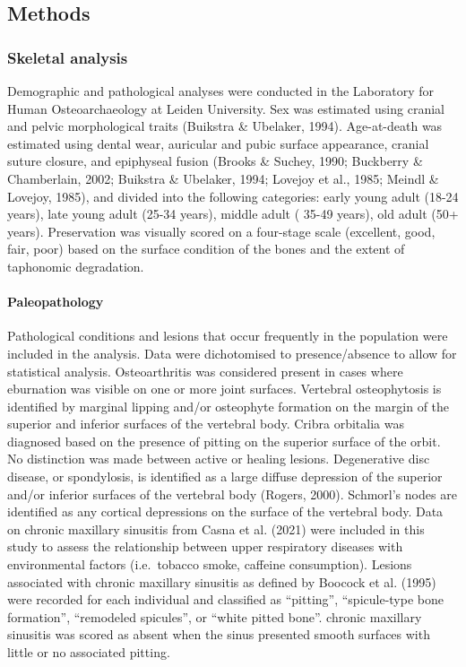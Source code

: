 \documentclass[
]{article}
\let\oldparagraph\paragraph
\renewcommand{\paragraph}[1]{\oldparagraph{#1}\mbox{}}
\begin{document}
\hypertarget{methods}{%
\subsection{Methods}\label{methods}}

\hypertarget{skeletal-analysis}{%
\subsubsection{Skeletal analysis}\label{skeletal-analysis}}

Demographic and pathological analyses were conducted in the Laboratory
for Human Osteoarchaeology at Leiden University. Sex was estimated using
cranial and pelvic morphological traits (Buikstra \& Ubelaker, 1994).
Age-at-death was estimated using dental wear, auricular and pubic
surface appearance, cranial suture closure, and epiphyseal fusion
(Brooks \& Suchey, 1990; Buckberry \& Chamberlain, 2002; Buikstra \&
Ubelaker, 1994; Lovejoy et al., 1985; Meindl \& Lovejoy, 1985), and
divided into the following categories: early young adult (18-24 years),
late young adult (25-34 years), middle adult ( 35-49 years), old adult
(50+ years). Preservation was visually scored on a four-stage scale
(excellent, good, fair, poor) based on the surface condition of the
bones and the extent of taphonomic degradation.

\hypertarget{paleopathology}{%
\paragraph{Paleopathology}\label{paleopathology}}

Pathological conditions and lesions that occur frequently in the
population were included in the analysis. Data were dichotomised to
presence/absence to allow for statistical analysis. Osteoarthritis was
considered present in cases where eburnation was visible on one or more
joint surfaces. Vertebral osteophytosis is identified by marginal
lipping and/or osteophyte formation on the margin of the superior and
inferior surfaces of the vertebral body. Cribra orbitalia was diagnosed
based on the presence of pitting on the superior surface of the orbit.
No distinction was made between active or healing lesions. Degenerative
disc disease, or spondylosis, is identified as a large diffuse
depression of the superior and/or inferior surfaces of the vertebral
body (Rogers, 2000). Schmorl's nodes are identified as any cortical
depressions on the surface of the vertebral body. Data on chronic
maxillary sinusitis from Casna et al. (2021) were included in this study
to assess the relationship between upper respiratory diseases with
environmental factors (i.e.~tobacco smoke, caffeine consumption).
Lesions associated with chronic maxillary sinusitis as defined by
Boocock et al. (1995) were recorded for each individual and classified
as ``pitting'', ``spicule-type bone formation'', ``remodeled spicules'',
or ``white pitted bone''. chronic maxillary sinusitis was scored as
absent when the sinus presented smooth surfaces with little or no
associated pitting.
\end{document}
